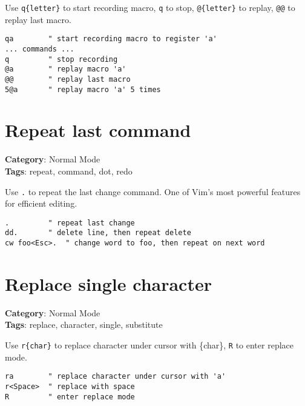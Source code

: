{{{{{{{{{{Use {\footnotesize \Verb§q{letter}§} to start recording macro, {\footnotesize \Verb§q§} to stop, {\footnotesize \Verb§@{letter}§} to replay, {\footnotesize \Verb§@@§} to replay last macro.

\begin{Exa*}{}
\begin{Verbatim}[fontsize=\footnotesize, breaklines, breakanywhere]
qa        " start recording macro to register 'a'
... commands ...
q         " stop recording
@a        " replay macro 'a'
@@        " replay last macro
5@a       " replay macro 'a' 5 times
\end{Verbatim}
\end{Exa*}

\section{Repeat last command}

\textbf{Category}: Normal Mode\\ \textbf{Tags}: repeat, command, dot, redo
\vspace{0.5cm}

Use {\footnotesize \Verb§.§} to repeat the last change command. One of Vim's most powerful features for efficient editing.

\begin{Exa*}{}
\begin{Verbatim}[fontsize=\footnotesize, breaklines, breakanywhere]
.         " repeat last change
dd.       " delete line, then repeat delete
cw foo<Esc>.  " change word to foo, then repeat on next word
\end{Verbatim}
\end{Exa*}

\section{Replace single character}

\textbf{Category}: Normal Mode\\ \textbf{Tags}: replace, character, single, substitute
\vspace{0.5cm}

Use {\footnotesize \Verb§r{char}§} to replace character under cursor with \{char\}, {\footnotesize \Verb§R§} to enter replace mode.

\begin{Exa*}{}
\begin{Verbatim}[fontsize=\footnotesize, breaklines, breakanywhere]
ra        " replace character under cursor with 'a'
r<Space>  " replace with space
R         " enter replace mode
\end{Verbatim}
\end{Exa*}

}}}}}}}}}}
